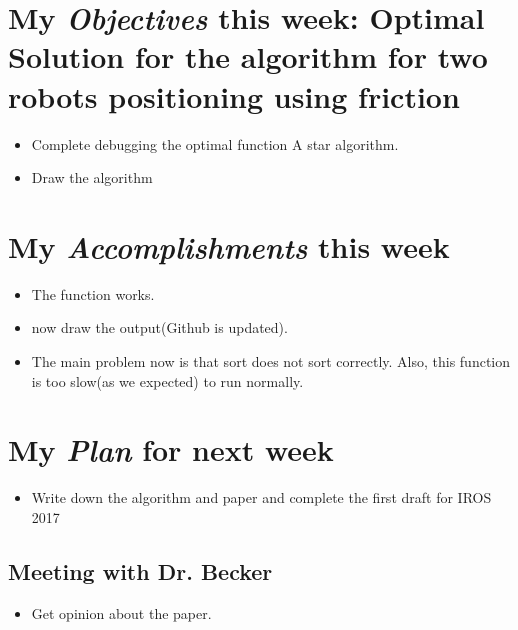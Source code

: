 \newcommand{\handoutName}{Weekly report}
\newcommand{\handoutdate}{\today}


\section{My \emph{Objectives} this week: Optimal Solution for the algorithm for two robots positioning using friction}
\begin{itemize}
\item Complete debugging the optimal function A star algorithm.
\item Draw the algorithm
\end{itemize}



\section{My \emph{Accomplishments} this week}


\begin{itemize}
\item The function works. 
\item now draw the output(Github is updated). 
\item The main problem now is that sort does not sort correctly. Also, this function is too slow(as we expected) to run normally. 
\end{itemize}


\section{My \emph{Plan} for next week}

\begin{itemize}
\item Write down the algorithm and paper and complete the first draft for IROS 2017
\end{itemize}

\subsection{Meeting with Dr. Becker  }

\begin{itemize}
\item Get opinion about the paper.
\end{itemize}


